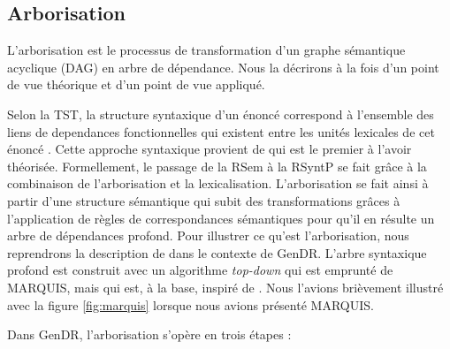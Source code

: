 \subsection{Arborisation}\label{sec:arbo}

L'arborisation est le processus de transformation d'un graphe sémantique acyclique (DAG) en arbre de dépendance. Nous la décrirons à la fois d'un point de vue théorique et d'un point de vue appliqué.

Selon la \ac{TST}, la structure syntaxique d'un énoncé correspond à l'ensemble des liens de dependances fonctionnelles qui existent entre les unités lexicales de cet énoncé \citep{melcuk1988}. Cette approche syntaxique provient de \cite{TesniereElementssyntaxestructurale1965} qui est le premier à l'avoir théorisée. Formellement, le passage de la \ac{RSem} à la \ac{RSyntP} se fait grâce à la combinaison de l'arborisation et la lexicalisation. L'arborisation se fait ainsi à partir d'une structure sémantique qui subit des transformations grâces à l'application de règles de correspondances sémantiques pour qu'il en résulte un arbre de dépendances profond. Pour illustrer ce qu'est l'arborisation, nous reprendrons la description de \cite{lareau18} dans le contexte de GenDR. L'arbre syntaxique profond est construit avec un algorithme \emph{top-down} qui est emprunté de MARQUIS, mais qui est, à la base, inspiré de \cite{PolguereStructurationmisejeu1990}. Nous l'avions brièvement illustré avec la figure \ref{fig:marquis} lorsque nous avions présenté MARQUIS.

Dans GenDR, l'arborisation s'opère en trois étapes \citep{lareau18}:

